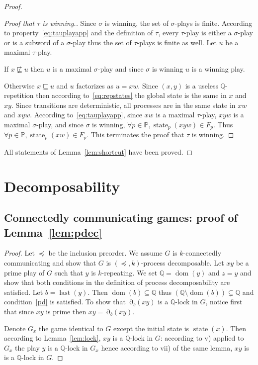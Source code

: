 \documentclass[a4paper,UKenglish]{lipics-v2016}
\newcommand{\PP}{\mathbb{P}}
\newcommand{\QQ}{\mathbb{Q}}
\newcommand{\pref}{\sqsubseteq}
\DeclareMathOperator{\dom}{dom}
\DeclareMathOperator{\view}{\partial}
\DeclareMathOperator{\last}{last}
\DeclareMathOperator{\state}{state}
\begin{document}
\begin{proof}
\begin{proof}[Proof that $\tau$ is winning.]
Since $\sigma$ is winning, the set of $\sigma$-plays is finite.
According to property~\eqref{eq:tauplayapp} and the definition of $\tau$,
every $\tau$-play is either a $\sigma$-play or is a subword of a $\sigma$-play thus the set of $\tau$-plays is finite as well.
Let $u$ be a maximal $\tau$-play.

If $x\not\pref u$ then $u$ is a maximal $\sigma$-play and since
$\sigma$ is winning $u$ is a winning play.

Otherwise $x\pref u$ and $u$ factorizes as $u=xw$.
Since $(x,y)$ is a useless $\QQ$-repetition
then according to~\eqref{eq:repstates} the global state is the same in $x$ and $xy$.
Since transitions are deterministic,
all processes are in the same state in $xw$ and $xyw$.
According to~\eqref{eq:tauplayapp},
since $xw$ is a maximal $\tau$-play,
$xyw$ is a maximal $\sigma$-play,
and since $\sigma$ is winning,
$\forall p\in\PP,\state_p(xyw)\in F_p$.
Thus
$\forall p\in\PP,\state_p(xw)\in F_p$.
This terminates the proof that  $\tau$ is winning.
\end{proof}


All statements of Lemma~\ref{lem:shortcut} have been proved.
\end{proof}


\section{Decomposability}

\subsection{Connectedly communicating games: proof of Lemma~\ref{lem:pdec}}

\begin{proof}
Let $\preceq$ be the inclusion preorder.
We assume $G$ is $k$-connectedly communicating and show that $G$ is $(\preceq,k)$-process decomposable.
Let $xy$ be a prime play of $G$ such that $y$ is $k$-repeating.
We set $\QQ=\dom(y)$ and $z=y$
and show that both conditions in the definition of process decomposability are satisfied.
Let $b=\last(y)$.
Then $\dom(b) \subseteq \QQ$
thus
$(\QQ \setminus \dom(b)) \subsetneq \QQ$
and condition~\eqref{pd} is satisfied.
To show that $\view_b(xy)$ is a $\QQ$-lock in $G$,
notice first that since $xy$ is prime then $xy=\view_{b}(xy)$.

Denote $G_x$ the game identical to $G$ except the initial state is $\state(x)$.
Then according to Lemma~\ref{lem:lock},
$xy$ is a $\QQ$-lock in $G$:
according to v) applied to $G_x$
the play $y$ is a $\QQ$-lock in $G_x$
hence according to vii) of the same lemma,
$xy$ is is a $\QQ$-lock in $G$.
\end{proof}
\end{document}
